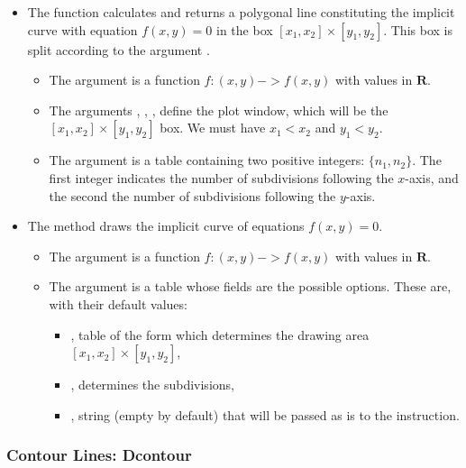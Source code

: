 \begin{itemize}
    \item The function  calculates and returns a polygonal line constituting the implicit curve with equation $f(x,y)=0$ in the box $[x_1,x_2]\times[y_1,y_2]$. This box is split according to the argument .

\begin{itemize}
    \item The argument  is a function \(f: (x,y) -> f(x,y)\) with values ​​in \(\mathbf R\).
    \item The arguments , , ,  define the plot window, which will be the $[x_1,x_2]\times[y_1,y_2]$ box. We must have \(x_1<x_2\) and \(y_1<y_2\).
    \item The argument  is a table containing two positive integers: $\{n_1,n_2\}$. The first integer indicates the number of subdivisions following the $x$-axis, and the second the number of subdivisions following the $y$-axis.
\end{itemize}

    \item The  method draws the implicit curve of equations $f(x,y)=0$.
\begin{itemize}
    \item The argument  is a function \(f: (x,y) -> f(x,y)\) with values ​​in \(\mathbf R\).
    \item The argument  is a table whose fields are the possible options. These are, with their default values:

\begin{itemize}
    \item {}, table of the form  which determines the drawing area $[x_1,x_2]\times[y_1,y_2]$,
    \item {}, determines the subdivisions,
    \item {}, string (empty by default) that will be passed as is to the \drawcmd instruction.
\end{itemize}
\end{itemize}
\end{itemize}

\subsubsection{Contour Lines: Dcontour}

